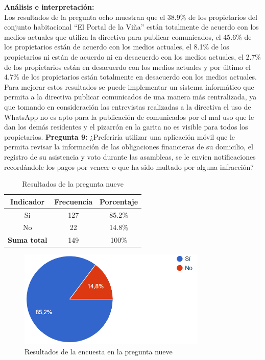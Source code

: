 \textbf{Análisis e interpretación:}\\
Los resultados de la pregunta ocho muestran que el 38.9\% de los propietarios del conjunto habitacional {\textquotedblleft}El Portal de la Viña{\textquotedblright} están totalmente de acuerdo con los medios actuales que utiliza la directiva para publicar comunicados, el 45.6\% de los propietarios están de acuerdo con los medios actuales, el 8.1\% de los propietarios ni están de acuerdo ni en desacuerdo con los medios actuales, el 2.7\% de los propietarios están en desacuerdo con los medios actuales y por último el 4.7\% de los propietarios están totalmente en desacuerdo con los medios actuales.
Para mejorar estos resultados se puede implementar un sistema informático que permita a la directiva publicar comunicados de una manera más centralizada, ya que tomando en consideración las entrevistas realizadas a la directiva el uso de WhatsApp no es apto para la publicación de comunicados por el mal uso que le dan los demás residentes y el pizarrón en la garita no es visible para todos los propietarios.
\bigbreak
\textbf{Pregunta 9:} ¿Preferiría utilizar una aplicación móvil que le permita revisar la información de las obligaciones financieras de su domicilio, el registro de su asistencia y voto durante las asambleas, se le envíen notificaciones recordándole los pagos por vencer o que ha sido multado por alguna infracción?

\begin{table}[H]
        \centering
        \caption{Resultados de la pregunta nueve}
        \begin{footnotesize}
        \begin{tabular}{|c|c|c|}
            \hline
            \textbf{Indicador} & \textbf{Frecuencia} &  \textbf{Porcentaje} \\
            \hline
            Si & 127 & 85.2\% \\
            \hline
            No & 22 & 14.8\% \\
            \hline
            \textbf{Suma total} & 149 & 100\% \\
            \hline
        \end{tabular}\label{tab:table_preg_9}
        \end{footnotesize}
    \end{table}

    \begin{figure}[H]
        \centering
        \includegraphics[width=0.8\textwidth]{resources/images/p9}
        \caption{Resultados de la encuesta en la pregunta nueve}\label{fig:figure_p9}
    \end{figure}

